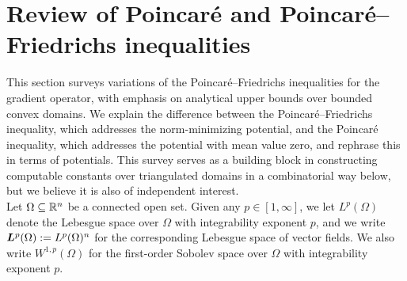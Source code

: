 \documentclass[10pt,a4paper]{article}
\begin{document}
\section{Review of Poincar\'e and Poincar\'e--Friedrichs inequalities}\label{section:poincare}

This section surveys variations of the Poincar\'e--Friedrichs inequalities for the gradient operator,
with emphasis on analytical upper bounds over bounded convex domains. 
We explain the difference between the Poincar\'e--Friedrichs inequality, which addresses the norm-minimizing potential, and the Poincar\'e inequality, which addresses the potential with mean value zero, and rephrase this in terms of potentials. 
This survey serves as a building block in constructing computable constants over triangulated domains in a combinatorial way below, but we believe it is also of independent interest.
\\

Let $\Omega \subseteq {\mathbb R}^{n}$ be a connected open set. 
Given any $p \in [1,\infty]$, we let $L^{p}(\Omega)$ denote the Lebesgue space over $\Omega$ with integrability exponent $p$, and we write $\bm{L}^{p}(\Omega) := L^{p}(\Omega)^{n}$ for the corresponding Lebesgue space of vector fields. 
We also write $W^{1,p}(\Omega)$ for the first-order Sobolev space over $\Omega$ with integrability exponent $p$. 

\end{document}
